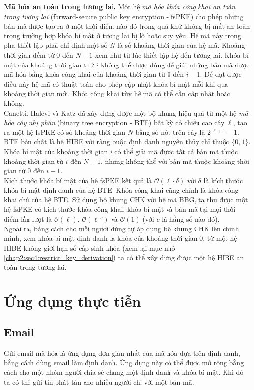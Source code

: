 \documentclass[class=report, crop=false]{standalone}
\begin{document}
			\noindent
			\textbf{Mã hóa an toàn trong tương lai.}\hspace{1ex}
			Một hệ \textit{mã hóa khóa công khai an toàn trong tương lai} (forward-secure public key encryption - fsPKE) cho phép những bản mã được tạo ra ở một thời điểm nào đó trong quá khứ không bị mất an toàn trong trường hợp khóa bí mật ở tương lai bị lộ hoặc suy yếu. Hệ mã này trong pha thiết lập phải chỉ định một số $N$ là số khoảng thời gian của hệ mã. Khoảng thời gian đếm từ 0 đến $N - 1$ xem như từ lúc thiết lập hệ đến tương lai. Khóa bí mật của khoảng thời gian thứ $i$ không thể được dùng để giải những bản mã được mã hóa bằng khóa công khai của khoảng thời gian từ $0$ đến $i - 1$. Để đạt được điều này hệ mã có thuật toán cho phép cập nhật khóa bí mật mỗi khi qua khoảng thời gian mới. Khóa công khai tùy hệ mã có thể cần cập nhật hoặc không. \\ \indent
			Canetti, Halevi và Katz \cite{DBLP:conf/eurocrypt/CanettiHK03} đã xây dựng được một bộ khung hiệu quả từ một hệ \textit{mã hóa cây nhị phân} (binary tree encryption - BTE) bất kỳ có chiều cao cây $\ell$, tạo ra một hệ fsPKE có số khoảng thời gian $N$ bằng số nốt trên cây là $2\,^{\ell + 1} - 1$. BTE bản chất là hệ HIBE với ràng buộc định danh nguyên thủy chỉ thuộc $\{0, 1 \}$. Khóa bí mật của khoảng thời gian $i$ có thể giải mã được tất cả bản mã thuộc khoảng thời gian từ $i$ đến $N - 1$, nhưng không thể với bản mã thuộc khoảng thời gian từ $0$ đến $i - 1$. \\ \indent
			Kích thước khóa bí mật của hệ fsPKE kết quả là $\mathcal{O}(\ell \cdot \delta)$ với $\delta$ là kích thước khóa bí mật định danh của hệ BTE. Khóa công khai cũng chính là khóa công khai chủ của hệ BTE. Sử dụng bộ khung CHK với hệ mã BBG, ta thu được một hệ fsPKE có kích thước khóa công khai, khóa bí mật và bản mã tại mọi thời điểm lần lượt là $\mathcal{O}(\ell)$, $\mathcal{O}(\ell\,^c)$ và $\mathcal{O}(1)$ (với $c$ là hằng số nào đó). \\ \indent			
			Ngoài ra, bằng cách cho mỗi người dùng tự áp dụng bộ khung CHK lên chính mình, xem khóa bí mật định danh là khóa của khoảng thời gian $0$, từ một hệ HIBE không giới hạn số cấp sinh khóa (xem lại mục nhỏ \ref{chap2:sec4:restrict_key_derivation}) ta có thể xây dựng được một hệ HIBE an toàn trong tương lai.
	\section{Ứng dụng thực tiễn}
		\subsection{Email}
			Gửi email mã hóa là ứng dụng đơn giản nhất của mã hóa dựa trên định danh, bằng cách dùng email làm định danh. Ứng dụng này có thể được mở rộng bằng cách cho một nhóm người chia sẻ chung một định danh và khóa bí mật. Khi đó ta có thể gửi tin phát tán cho nhiều người chỉ với một bản mã.
\end{document}
